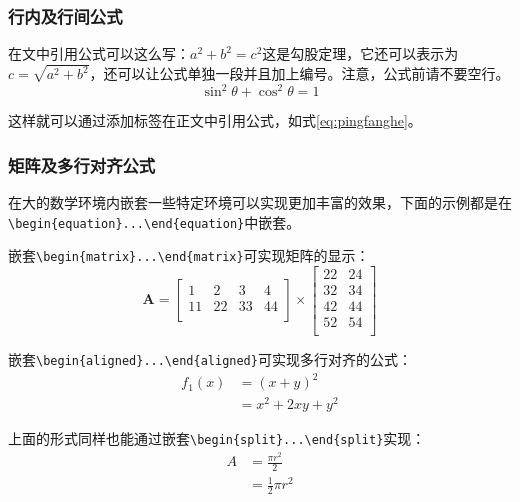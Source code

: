 \subsubsection{行内及行间公式}

在文中引用公式可以这么写：$a^2+b^2=c^2$这是勾股定理，它还可以表示为$c=\sqrt{a^2+b^2}$，还可以让公式单独一段并且加上编号。注意，公式前请不要空行。
\begin{equation}
\sin^2{\theta}+\cos^2{\theta}=1 \label{eq:pingfanghe}
\end{equation}

这样就可以通过添加标签在正文中引用公式，如式\eqref{eq:pingfanghe}。

\subsubsection{矩阵及多行对齐公式}

在大的数学环境内嵌套一些特定环境可以实现更加丰富的效果，下面的示例都是在\verb|\begin{equation}...\end{equation}|中嵌套。

嵌套\verb|\begin{matrix}...\end{matrix}|可实现矩阵的显示：
\begin{equation}
  \mathbf{A}=
  \left[\begin{matrix}
    1&2&3&4\\
    11&22&33&44\\
  \end{matrix}\right] \times
  \left[\begin{matrix}
    22&24\\
    32&34\\
    42&44\\
    52&54\\
  \end{matrix}\right]
\end{equation}

嵌套\verb|\begin{aligned}...\end{aligned}|可实现多行对齐的公式：
\begin{equation}
  \begin{aligned}
    f_1(x)&=(x+y)^2\\
          &=x^2+2xy+y^2
  \end{aligned}
\end{equation}

上面的形式同样也能通过嵌套\verb|\begin{split}...\end{split}|实现：
\begin{equation}
\begin{split}
A & = \frac{\pi r^2}{2} \\
 & = \frac{1}{2} \pi r^2
\end{split}
\end{equation}

